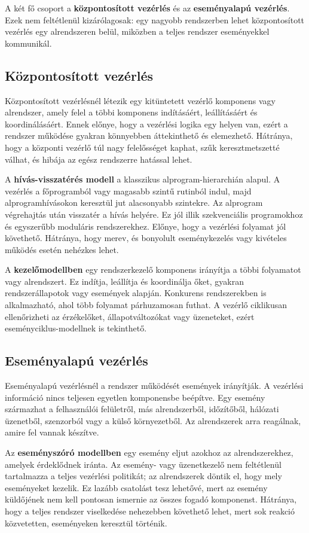 A két fő csoport a \textbf{központosított vezérlés} és az \textbf{eseményalapú vezérlés}. Ezek nem feltétlenül kizárólagosak: egy nagyobb rendszerben lehet központosított vezérlés egy alrendszeren belül, miközben a teljes rendszer eseményekkel kommunikál.

\subsection{Központosított vezérlés}

Központosított vezérlésnél létezik egy kitüntetett vezérlő komponens vagy alrendszer, amely felel a többi komponens indításáért, leállításáért és koordinálásáért. Ennek előnye, hogy a vezérlési logika egy helyen van, ezért a rendszer működése gyakran könnyebben áttekinthető és elemezhető. Hátránya, hogy a központi vezérlő túl nagy felelősséget kaphat, szűk keresztmetszetté válhat, és hibája az egész rendszerre hatással lehet.

A \textbf{hívás-visszatérés modell} a klasszikus alprogram-hierarchián alapul. A vezérlés a főprogramból vagy magasabb szintű rutinból indul, majd alprogramhívásokon keresztül jut alacsonyabb szintekre. Az alprogram végrehajtás után visszatér a hívás helyére. Ez jól illik szekvenciális programokhoz és egyszerűbb moduláris rendszerekhez. Előnye, hogy a vezérlési folyamat jól követhető. Hátránya, hogy merev, és bonyolult eseménykezelés vagy kivételes működés esetén nehézkes lehet.

A \textbf{kezelőmodellben} egy rendszerkezelő komponens irányítja a többi folyamatot vagy alrendszert. Ez indítja, leállítja és koordinálja őket, gyakran rendszerállapotok vagy események alapján. Konkurens rendszerekben is alkalmazható, ahol több folyamat párhuzamosan futhat. A vezérlő ciklikusan ellenőrizheti az érzékelőket, állapotváltozókat vagy üzeneteket, ezért eseményciklus-modellnek is tekinthető.

\subsection{Eseményalapú vezérlés}

Eseményalapú vezérlésnél a rendszer működését események irányítják. A vezérlési információ nincs teljesen egyetlen komponensbe beépítve. Egy esemény származhat a felhasználói felületről, más alrendszerből, időzítőből, hálózati üzenetből, szenzorból vagy a külső környezetből. Az alrendszerek arra reagálnak, amire fel vannak készítve.

Az \textbf{eseményszóró modellben} egy esemény eljut azokhoz az alrendszerekhez, amelyek érdeklődnek iránta. Az esemény- vagy üzenetkezelő nem feltétlenül tartalmazza a teljes vezérlési politikát; az alrendszerek döntik el, hogy mely eseményeket kezelik. Ez lazább csatolást tesz lehetővé, mert az esemény küldőjének nem kell pontosan ismernie az összes fogadó komponenst. Hátránya, hogy a teljes rendszer viselkedése nehezebben követhető lehet, mert sok reakció közvetetten, eseményeken keresztül történik.

